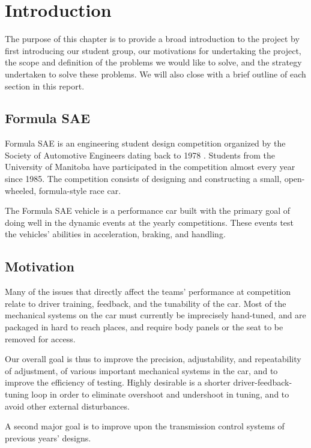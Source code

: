 \chapter{Introduction\label{cha:introduction}}

The purpose of this chapter is to provide a broad introduction to the project by first introducing our student group, our motivations for undertaking the project, the scope and definition of the problems we would like to solve, and the strategy undertaken to solve these problems. We will also close with a brief outline of each section in this report.

\section{Formula SAE}

Formula SAE is an engineering student design competition organized by the Society of Automotive Engineers dating back to 1978 \cite{fsaehistory}. Students from the University of Manitoba have participated in the competition almost every year since 1985. The competition consists of designing and constructing a small, open-wheeled, formula-style race car.

The Formula SAE vehicle is a performance car built with the primary goal of doing well in the dynamic events at the yearly competitions. These events test the vehicles' abilities in acceleration, braking, and handling. 

\section{Motivation}

Many of the issues that directly affect the teams' performance at competition relate to driver training, feedback, and the tunability of the car. Most of the mechanical systems on the car must currently be imprecisely hand-tuned, and are packaged in hard to reach places, and require body panels or the seat to be removed for access.

Our overall goal is thus to improve the precision, adjustability, and repeatability of adjustment, of various important mechanical systems in the car, and to improve the efficiency of testing. Highly desirable is a shorter driver-feedback-tuning loop in order to eliminate overshoot and undershoot in tuning, and to avoid other external disturbances.

A second major goal is to improve upon the transmission control systems of previous years' designs.


